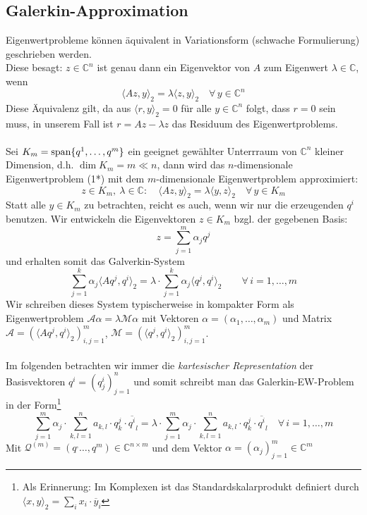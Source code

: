 \subsection{Galerkin-Approximation}
Eigenwertprobleme können äquivalent in Variationsform (schwache Formulierung) geschrieben werden.\\
Diese besagt: $z\in\mathbb{C}^n$ ist genau dann ein Eigenvektor von $A$ zum Eigenwert $\lambda\in\mathbb{C}$, wenn
\[\langle Az,y\rangle_2 = \lambda\langle z,y\rangle_2 \quad\forall\,y\in\mathbb{C}^n\tag{1*}\]
Diese Äquivalenz gilt, da aus $\langle r, y\rangle_2 = 0$ für alle $y\in\mathbb{C}^{n}$ folgt, dass $r=0$ sein muss, 
in unserem Fall ist $r=Az-\lambda z$ das Residuum des Eigenwertproblems.\\ \\
Sei $K_m=\text{span}\{q^1,\dotsc,q^m\}$ ein geeignet gewählter Unterrraum von $\mathbb{C}^n$ kleiner Dimension, d.h. 
$\dim K_m=m\ll n$, dann wird das $n$-dimensionale Eigenwertproblem (1*) mit dem $m$-dimensionale Eigenwertproblem
approximiert: 
\[z\in K_m, \ \lambda\in\mathbb{C}: \quad \langle Az,y\rangle_2=\lambda\langle y,z\rangle_2 \quad\forall\,y\in K_m\]
Statt alle $y\in K_m$ zu betrachten, reicht es auch, wenn wir nur die erzeugenden $q^i$ benutzen. 
Wir entwickeln die Eigenvektoren $z\in K_m$ bzgl. der gegebenen Basis:
\[z = \sum_{j=1}^{m} \alpha_j q^j\]
und erhalten somit das Galverkin-System
\[\sum_{j=1}^{k} \alpha_j \langle Aq^j,q^i\rangle_2 = \lambda\cdot\sum_{j=1}^{k} \alpha_j \langle q^j,q^i\rangle_2
\qquad\forall\,i=1,\dotsc,m\]
Wir schreiben dieses System typischerweise in kompakter Form als Eigenwertproblem 
$\mathcal{A}\alpha = \lambda\mathcal{M}\alpha$ mit Vektoren $\alpha=(\alpha_1,\dotsc,\alpha_m)$ und Matrix 
$\mathcal{A}=(\langle Aq^j, q^i\rangle_2)_{i,j=1}^m$, 
$\mathcal{M} = (\langle q^j, q^i\rangle_2)_{i,j=1}^m$. \\ \\
Im folgenden betrachten wir immer die \textit{kartesischer Representation} der Basisvektoren $q^{i}=(q_j^i)_{j=1}^n$ 
und somit schreibt man das Galerkin-EW-Problem in der Form\footnote{
    Als Erinnerung: Im Komplexen ist das Standardskalarprodukt definiert durch 
    $\langle x,y\rangle_2 = \sum_i x_i\cdot\overline{y}_i$
}
\[\sum_{j=1}^{m} \alpha_j\cdot \sum_{k,l=1}^{n} a_{k,l}\cdot q_k^{j}\cdot\overline{q^i}_l = 
\lambda\cdot \sum_{j=1}^{m} \alpha_j \cdot\sum_{k,l=1}^{n} a_{k,l}\cdot q_k^{j}\cdot\overline{q^i}_l
\quad\forall\, i=1,\dotsc,m\]
Mit $\mathcal{Q}^{(m)}=(q^,\dotsc,q^m)\in\mathbb{C}^{n\times m}$  und dem Vektor $\alpha=(\alpha_j)_{j=1}^m\in\mathbb{C}^m$ 
